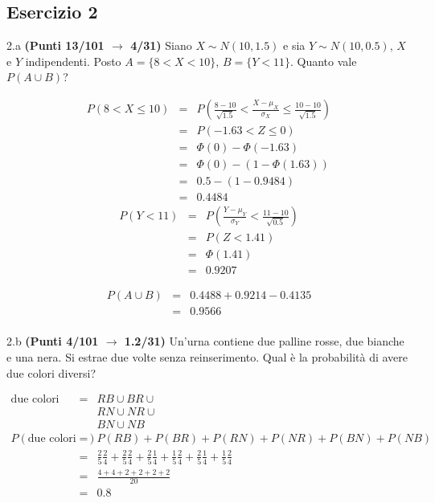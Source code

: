 \documentclass[
  11pt,
]{book}
\theoremstyle{mytheoremstyle}
\theoremstyle{mydefstyle}
\newenvironment{sol}
  {
  \begin{tcolorbox}[enhanced,breakable,arc=0.1mm,boxrule=1pt,colback=white,colframe=iblue,
  title=\bf \fontfamily{lmss}\selectfont \hspace{.5 cm} Soluzione,drop fuzzy shadow]

}{
\end{tcolorbox}
  }
\begin{document}
\subsection{Esercizio 2}\label{esercizio-2-19}

2.a \textbf{(Punti 13/101 \(\rightarrow\) 4/31)} Siano \(X\sim N(10,1.5)\) e sia \(Y\sim N(10,0.5)\), \(X\) e \(Y\) indipendenti. Posto \(A=\{8<X<10\}\), \(B=\{Y<11\}\).
Quanto vale \(P(A\cup B)\)?

\begin{sol}
\begin{eqnarray*}
   P( 8 < X \leq  10 ) &=& P\left( \frac { 8  -  10 }{\sqrt{ 1.5 }} < \frac { X  -  \mu_X }{ \sigma_X } \leq \frac { 10  -  10 }{\sqrt{ 1.5 }}\right)  \\
              &=& P\left(  -1.63  < Z \leq  0 \right) \\
              &=& \Phi( 0 )-\Phi( -1.63 )\\
              &=&  \Phi( 0 )-(1-\Phi( 1.63 )) \\ &=&  0.5 -(1- 0.9484 ) \\ 
              &=&  0.4484 
   \end{eqnarray*}
\begin{eqnarray*}
      P( Y   <   11 ) 
        &=& P\left(  \frac { Y  -  \mu_Y }{ \sigma_Y }  <  \frac { 11  -  10 }{\sqrt{ 0.5 }} \right)  \\
                 &=& P\left(  Z   <   1.41 \right) \\    
                 &=&  \Phi( 1.41 ) \\ &=&  0.9207 
      \end{eqnarray*}

\begin{eqnarray*}
  P(A\cup B) &=&  0.4488+ 0.9214-0.4135\\
             &=&  0.9566\\
\end{eqnarray*}

\end{sol}

2.b \textbf{(Punti 4/101 \(\rightarrow\) 1.2/31)} Un'urna contiene due palline rosse, due bianche e una nera. Si estrae due volte senza reinserimento. Qual è la probabilità di avere due colori diversi?

\begin{sol}
\begin{eqnarray*}
  \text{due colori diversi} &=& RB\cup BR \cup\\
                            &&  RN\cup NR \cup\\
                            &&  BN\cup NB\\
  P(\text{due colori diversi}) &=& P(RB)+P(BR)+P(RN)+P(NR)+P(BN)+P(NB)\\
  &=& \frac 25\frac 24+\frac 25\frac 24+\frac 25\frac 14+\frac 15\frac 24+\frac 25\frac 14+\frac 15\frac 24\\
  &=& \frac{4+4+2+2+2+2}{20}\\
  &=& 0.8
\end{eqnarray*}

\end{sol}
\end{document}
